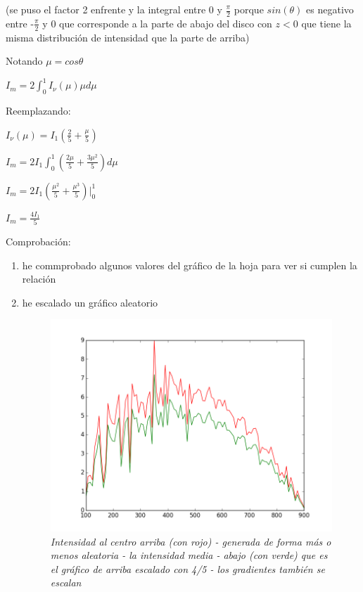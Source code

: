\documentclass[10pt]{book}
\begin{document}
(se puso el factor 2 enfrente y la integral entre 0 y $\frac{\pi}{2}$ porque $sin(\theta)$ es negativo entre -$\frac{\pi}{2}$ y 0 que corresponde
a la parte de abajo del disco con $z  <  0$ que tiene la misma distribución de intensidad que la parte de arriba)

Notando $\mu = cos \theta$

$I_m = 2 \int_{0}^{1} { I_{\nu}(\mu) \mu  d\mu} $

Reemplazando:

$I_{\nu}(\mu) = I_1 (\frac{2}{5} + \frac{\mu}{5}) $


$I_m = 2 I_1 \int_{0}^{1} (\frac{ 2\mu}{5} + \frac{ 3\mu^2}{5}) d\mu $

$I_m = 2 I_1 (\frac{ \mu^2}{5} + \frac{ \mu^3}{5} ) |_{0}^{1}$

$I_m = \frac{4 I_1}{5}$

Comprobación:

\begin{enumerate}

\item he commprobado algunos valores del gráfico de la hoja para ver si cumplen la relación

\item he escalado un gráfico aleatorio

\begin{figure}[!ht]
 \centering
 \includegraphics[scale=0.4]{ld.png}
 \caption{\emph{Intensidad al centro arriba (con rojo) - generada de forma más o menos aleatoria - la intensidad media - abajo (con verde)
que es el gráfico de arriba escalado con 4/5 - los gradientes también se escalan}}
\end{figure}

\end{enumerate}
\end{document}
